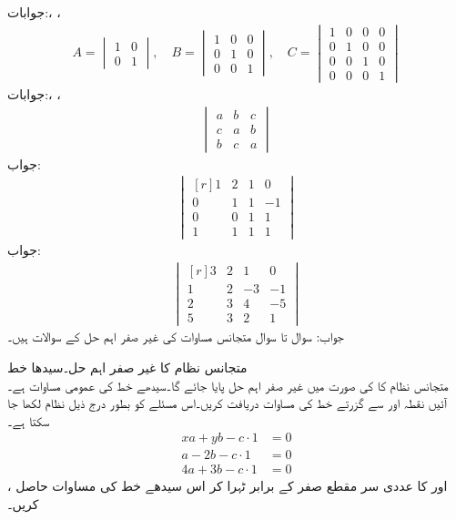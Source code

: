 جوابات:، ، 
\begin{align*}
A=\begin{vmatrix}
1&0\\
0&1
\end{vmatrix}, \quad
B=\begin{vmatrix}
1&0&0\\
0&1&0\\
0&0&1
\end{vmatrix},\quad 
C=\begin{vmatrix}
1&0&0&0\\
0&1&0&0\\
0&0&1&0\\
0&0&0&1
\end{vmatrix}
\end{align*}
جوابات:، ، 
\begin{align*}
\begin{vmatrix}
a&b&c\\
c&a&b\\
b&c&a
\end{vmatrix}
\end{align*}
جواب:
\begin{align*}
\begin{vmatrix*}[r]
1&2&1&0\\
0&1&1&-1\\
0&0&1&1\\
1&1&1&1
\end{vmatrix*}
\end{align*}
جواب:
\begin{align*}
\begin{vmatrix*}[r]
3&2&1&0\\
1&2&-3&-1\\
2&3&4&-5\\
5&3&2&1
\end{vmatrix*}
\end{align*}
جواب:
سوال  تا سوال  متجانس مساوات کی غیر صفر اہم حل کے سوالات ہیں۔

\quad متجانس نظام کا غیر صفر اہم حل۔سیدھا خط\\
متجانس نظام کا  کی صورت میں غیر صفر اہم حل پایا جائے گا۔سیدھے خط کی عمومی مساوات  ہے۔آئیں نقطہ  اور  سے گزرتے خط کی مساوات دریافت کریں۔اس مسئلے کو بطور درج ذیل نظام لکھا جا سکتا ہے۔
\begin{align*}
xa+yb-c\cdot 1&=0\\
a-2b-c\cdot1&=0\\
4a+3b-c\cdot1&=0
\end{align*} 
،  اور  کا عددی سر مقطع صفر کے برابر ٹہرا کر اس سیدھے خط کی مساوات حاصل کریں۔

